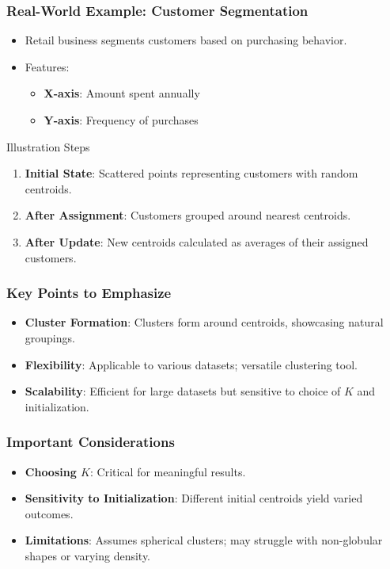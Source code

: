 \documentclass[aspectratio=169]{beamer}
\begin{document}
\begin{frame}[fragile]
    \frametitle{Real-World Example: Customer Segmentation}
    \begin{itemize}
        \item Retail business segments customers based on purchasing behavior.
        \item Features:
            \begin{itemize}
                \item \textbf{X-axis}: Amount spent annually
                \item \textbf{Y-axis}: Frequency of purchases
            \end{itemize}
    \end{itemize}
    \begin{block}{Illustration Steps}
        \begin{enumerate}
            \item \textbf{Initial State}: Scattered points representing customers with random centroids.
            \item \textbf{After Assignment}: Customers grouped around nearest centroids.
            \item \textbf{After Update}: New centroids calculated as averages of their assigned customers.
        \end{enumerate}
    \end{block}
\end{frame}

\begin{frame}[fragile]
    \frametitle{Key Points to Emphasize}
    \begin{itemize}
        \item \textbf{Cluster Formation}: Clusters form around centroids, showcasing natural groupings.
        \item \textbf{Flexibility}: Applicable to various datasets; versatile clustering tool.
        \item \textbf{Scalability}: Efficient for large datasets but sensitive to choice of \(K\) and initialization.
    \end{itemize}
\end{frame}

\begin{frame}[fragile]
    \frametitle{Important Considerations}
    \begin{itemize}
        \item \textbf{Choosing \(K\)}: Critical for meaningful results.
        \item \textbf{Sensitivity to Initialization}: Different initial centroids yield varied outcomes.
        \item \textbf{Limitations}: Assumes spherical clusters; may struggle with non-globular shapes or varying density.
    \end{itemize}
\end{frame}
\end{document}
